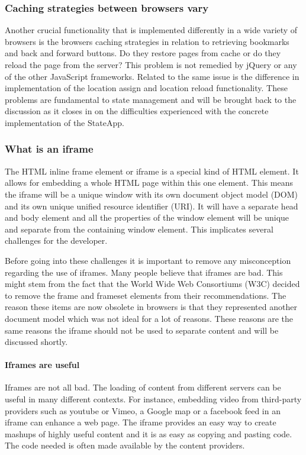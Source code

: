\documentclass[english]{ifimaster}
\begin{document}
\subsubsection{Caching strategies between browsers vary}
Another crucial functionality that is implemented differently in a wide variety of browsers is the browsers caching strategies in relation to retrieving bookmarks and back and forward buttons. Do they restore pages from cache or do they reload the page from the server? This problem is not remedied by jQuery or any of the other JavaScript frameworks. Related to the same issue is the difference in implementation of the location assign and location reload functionality. These problems are fundamental to state management and will be brought back to the discussion as it closes in on the difficulties experienced with the concrete implementation of the StateApp. 


\subsubsection{What is an iframe}
\label{sec:iframes}
The HTML inline frame element or iframe is a special kind of HTML element. It allows for embedding a whole HTML page within this one element. This means the iframe will be a unique window with its own document object model (DOM) and its own unique unified resource identifier (URI). It will have a separate head and body element and all the properties of the window element will be unique and separate from the containing window element. This implicates several challenges for the developer. 

Before going into these challenges it is important to remove any misconception regarding the use of iframes. Many people believe that iframes are bad. This might stem from the fact that the World Wide Web Consortiums (W3C) decided to remove the frame and frameset elements from their recommendations. The reason these items are now obsolete in browsers is that they represented another document model which was not ideal for a lot of reasons. These reasons are the same reasons the iframe should not be used to separate content and will be discussed shortly.

\paragraph{Iframes are useful}
Iframes are not all bad. The loading of content from different servers can be useful in many different contexts. For instance, embedding video from third-party providers such as youtube or Vimeo, a Google map or a facebook feed in an iframe can enhance a web page. The iframe provides an easy way to create mashups of highly useful content and it is as easy as copying and pasting code. The code needed is often made available by the content providers. 
\end{document}
